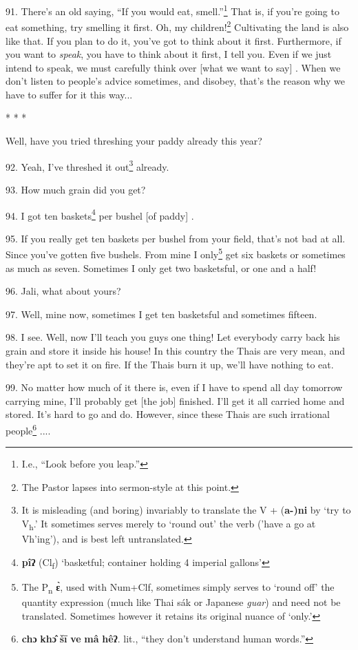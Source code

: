 91. There's an old saying, ``If you would eat, smell.''\footnote{I.e., ``Look before you leap.''} That
is, if you're going to eat something, try smelling it first. Oh, my children!\footnote{The Pastor lapses into sermon-style at this point.}
Cultivating the land is also like that. If you plan to do it, you've got to think
about it first. Furthermore, if you want to \textit{speak}, you have to think about
it first, I tell you. Even if we just intend to speak, we must carefully think
over [what we want to say] . When we don't listen to people's advice sometimes,
and disobey, that's the reason why we have to suffer for it this way...

\begin{center}
* * *
\end{center}

Well, have you tried threshing your paddy already this year?

92. Yeah, I've threshed it out\footnote{It is misleading (and boring) invariably to translate the V + (\textbf{a-)ni} by `try to V\textsubscript{h}.' It sometimes serves merely to `round out' the verb ('have a go at Vh'ing'), and is best left untranslated.} already.

93. How much grain did you get?

94. I got ten baskets\footnote{\textbf{pîʔ} (Cl\textsubscript{f}) `basketful; container holding 4 imperial gallons'} per bushel [of paddy] .

95. If you really get ten baskets per bushel from your field, that's not bad at
all. Since you've gotten five bushels. From mine I only\footnote{The P\textsubscript{n } \textbf{ɛ̀}, used with Num+Clf, sometimes simply serves to `round off' the quantity expression (much like Thai sák or Japanese \textit{guar}) and need not be translated. Sometimes however it retains its original nuance of `only.'} get six baskets or
sometimes as much as seven. Sometimes I only get two basketsful, or one and a half!

96. Jali, what about yours?

97. Well, mine now, sometimes I get ten basketsful and sometimes fifteen.

98. I see. Well, now I'll teach you guys one thing! Let everybody carry back his
grain and store it inside his house! In this country the Thais are very mean, and
they're apt to set it on fire. If the Thais burn it up, we'll have nothing to eat.

99. No matter how much of it there is, even if I have to spend all day tomorrow
carrying mine, I'll probably get [the job] finished. I'll get it all carried home
and stored. It's hard to go and do. However, since these Thais are such irrational
people\footnote{\textbf{chɔ} \textbf{khɔ̂} \textbf{šī} \textbf{ve} \textbf{mâ} \textbf{hêʔ}. lit., ``they don't understand human words.''} ....

